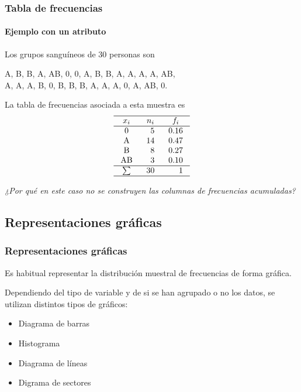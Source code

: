 \begin{frame}
\frametitle{Tabla de frecuencias}
\framesubtitle{Ejemplo con un atributo}
Los grupos sanguíneos de 30 personas son
\begin{center}
A, B, B, A, AB, 0, 0, A, B, B, A, A, A, A, AB,\\
A, A, A, B, 0, B, B, B, A, A, A, 0, A, AB, 0. 
\end{center}
La tabla de frecuencias asociada a esta muestra es
\[
\setlength\arraycolsep{3mm}
\setlength\arrayrulewidth{0.5pt}
\begin{array}{crr}
\hline
\multicolumn{1}{c}{x_i} & \multicolumn{1}{c}{n_i} & \multicolumn{1}{c}{f_i} \\
\hline
\mbox{0} & 5 & 0.16 \\
\mbox{A} & 14 & 0.47 \\
\mbox{B} & 8 & 0.27 \\
\mbox{AB} & 3 & 0.10 \\
\hline 
\sum & 30 & 1 \\
\hline
\end{array}
\]
\begin{center}
\emph{¿Por qué en este caso no se construyen las columnas de frecuencias acumuladas?}
\end{center}
\end{frame}


\subsection{Representaciones gráficas}

\begin{frame}
\frametitle{Representaciones gráficas}
Es habitual representar la distribución muestral de frecuencias de forma gráfica.

Dependiendo del tipo de variable y de si se han agrupado o no los datos, se utilizan distintos tipos de gráficos:
\begin{itemize}
\item Diagrama de barras
\item Histograma
\item Diagrama de líneas
\item Digrama de sectores
\end{itemize}

\end{frame}


